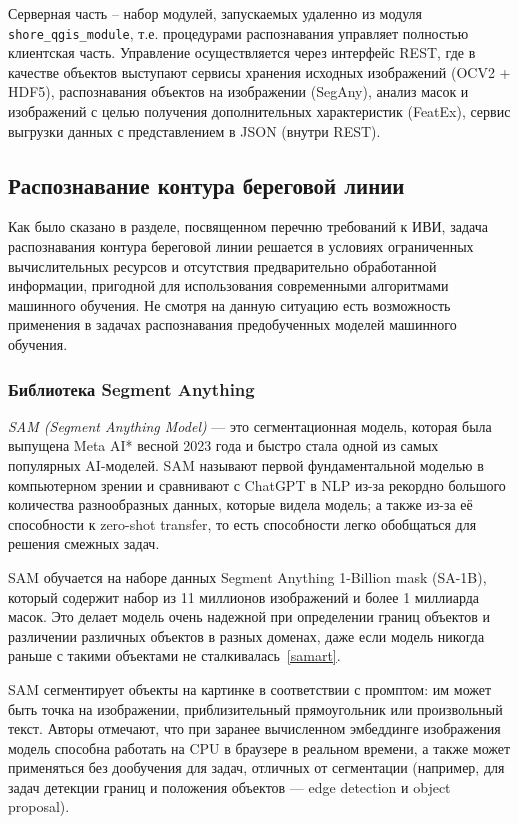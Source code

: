 \documentclass[732,fontsize=14pt,final]{studrep}
\begin{document}
Серверная часть -- набор модулей, запускаемых удаленно из модуля \verb|shore_qgis_module|, т.е. процедурами распознавания управляет полностью   клиентская часть. Управление осуществляется через интерфейс REST, где в качестве объектов выступают сервисы хранения исходных изображений (OCV2 + HDF5), распознавания объектов на изображении (SegAny), анализ масок и изображений с целью получения дополнительных характеристик (FeatEx), сервис выгрузки данных с представлением в JSON (внутри REST).

\subsection{Распознавание контура береговой линии}

Как было сказано в разделе, посвященном перечню требований к ИВИ, задача распознавания контура береговой линии решается в условиях ограниченных вычислительных ресурсов и отсутствия предварительно обработанной информации, пригодной для использования современными алгоритмами машинного обучения. Не смотря на данную ситуацию есть возможность применения в задачах распознавания предобученных моделей машинного обучения. 

\subsubsection{Библиотека Segment Anything}
\label{sec:sam}

\emph{SAM (Segment Anything Model)} — это сегментационная модель, которая была выпущена Meta AI*  весной 2023 года и быстро стала одной из самых популярных AI-моделей. SAM называют первой фундаментальной моделью в компьютерном зрении и сравнивают с ChatGPT в NLP из-за рекордно большого количества разнообразных данных, которые видела модель; а также из-за её способности к zero-shot transfer, то есть способности легко обобщаться для решения смежных задач.

SAM обучается на наборе данных Segment Anything 1-Billion mask (SA-1B), который содержит набор из 11 миллионов изображений и более 1 миллиарда масок. Это делает модель очень надежной при определении границ объектов и различении различных объектов в разных доменах, даже если модель никогда раньше с такими объектами не сталкивалась~\ref{samart}.

SAM сегментирует объекты на картинке в соответствии с промптом: им может быть точка на изображении, приблизительный прямоугольник или произвольный текст. Авторы отмечают, что при заранее вычисленном эмбеддинге изображения модель способна работать на CPU в браузере в реальном времени, а также может применяться без дообучения для задач, отличных от сегментации (например, для задач детекции границ и положения объектов — edge detection и object proposal).
\end{document}

